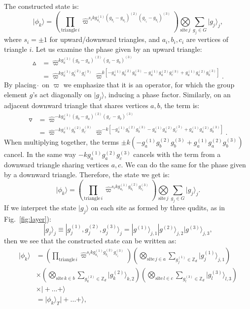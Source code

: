 \documentclass[aps,amsfonts,pra,twocolumn,showpacs]{revtex4-1}
\def\ket#1{\vert#1\rangle}
\newcommand{\be}{\begin{equation}}
\newcommand{\ee}{\end{equation}}
\newcommand{\zd}{\mathbb{Z}_d}
\begin{document}
The constructed state is:
	\be
	|\phi_k\rangle = \left( \prod_{\mathrm{triangle} \, i} \hat{\varpi}^{s_i k g_{a_i}^{(1)} (g_{b_i}-g_{a_i})^{(2)} (g_{c_i}-g_{b_i})^{(3)}} \right) \underset{\mathrm{site} \, j}{\bigotimes} \sum_{g_j \in G} \ket{g_j}_j,
	\ee
where $s_i=\pm1$ for upward/downward triangles, and $a_i, b_i, c_i$ are vertices of triangle $i$. Let us examine the phase given by an upward triangle: 
	\begin{align}
	\vartriangle & = \hat{\varpi}^{k g_a^{(1)} (g_b-g_a)^{(2)} (g_c-g_b)^{(3)}} \nonumber \\
		& = \hat{\varpi}^{k g_a^{(1)} g_b^{(2)} g_c^{(3)}} \hat{\varpi}^{k [-g_a^{(1)} g_b^{(2)} g_b^{(3)} -g_a^{(1)} g_a^{(2)} g_c^{(3)} +g_a^{(1)} g_a^{(2)} g_b^{(3)}]}.
	\end{align}
By placing $\hat{\,}$ on $\varpi$ we emphasize that it is an operator, for which the group element $g$'s act diagonally on $\ket{g_j}$, inducing a phase factor. Similarly, on an adjacent downward triangle that shares vertices $a, b$, the term is:
	\begin{align}
	\triangledown & = \hat{\varpi}^{-k g_a^{(1)} (g_b-g_a)^{(2)} (g_{c^\prime}-g_b)^{(3)}} \nonumber \\
		& = \hat{\varpi}^{-k g_a^{(1)} g_b^{(2)} g_{c^\prime}^{(3)}} \hat{\varpi}^{-k [-g_a^{(1)} g_b^{(2)} g_b^{(3)} -g_a^{(1)} g_a^{(2)} g_{c^\prime}^{(3)} +g_a^{(1)} g_a^{(2)} g_b^{(3)}]}.
	\end{align}
When multiplying together, the terms $\pm k (-g_a^{(1)} g_b^{(2)} g_b^{(3)}+g_a^{(1)} g_a^{(2)} g_b^{(3)})$ cancel. In the same way $-kg_a^{(1)} g_a^{(2)} g_c^{(3)}$ cancels with the term from a downward triangle sharing vertices $a, c$. We can do the same for the phase given by a downward triangle. Therefore, the state we get is:
	\be
	|\phi_k\rangle = \left( \prod_{\mathrm{triangle} \, i} \hat{\varpi}^{s_i k g_{a_i}^{(1)} g_{b_i}^{(2)} g_{c_i}^{(3)}} \right) \underset{\mathrm{site} \, j}{\bigotimes} \sum_{g_j \in G} \ket{g_j}_j.
	\ee
If we interpret the state $|g_j\rangle$ on each site as formed by three qudits, as in Fig.~\ref{fig:layer}):
	\be
	|g_j\rangle_j \equiv |g_j^{(1)}, g_j^{(2)}, g_j^{(3)}\rangle_j = |g^{(1)}\rangle_{j, 1} |g^{(2)}\rangle_{j, 2} |g^{(3)}\rangle_{j, 3},
	\ee
then we see that the constructed state can be written as:
	\begin{align}
	\ket{\phi_k} & = \left( \prod_{\mathrm{triangle} \, i}  \hat{\varpi}^{s_i k g_{a_i}^{(1)} g_{b_i}^{(2)} g_{c_i}^{(3)}} \right) \left( \underset{\mathrm{site} \, j \in a}{\bigotimes} \sum_{g_j^{(1)} \in \zd} \ket{g_j^{(1)}}_{j, 1} \right) \nonumber \\
		& \times \left( \underset{\mathrm{site} \, k \in b}{\bigotimes} \sum_{g_k^{(2)} \in \zd} \ket{g_k^{(2)}}_{k, 2} \right) \left( \underset{\mathrm{site} \, l \in c}{\bigotimes} \sum_{g_l^{(3)} \in \zd} \ket{g_l^{(3)}}_{l, 3} \right) \nonumber \\
		& \times \ket{+...+} \nonumber \\
		& = \ket{\phi_k}_T \ket{+...+},
	\end{align}
\end{document}
